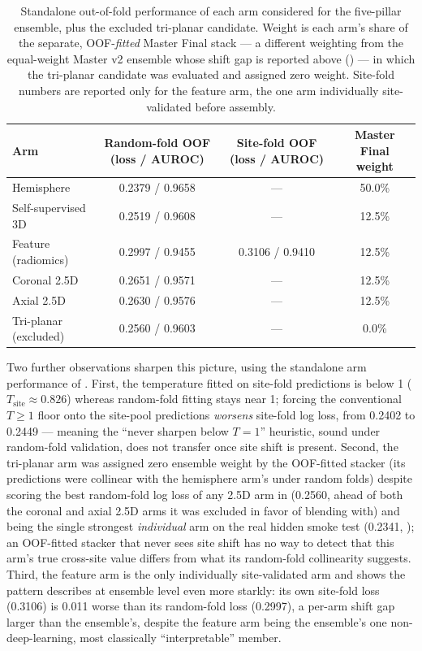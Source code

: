 \documentclass[11pt]{article}
\begin{document}
\begin{table}[t]
\centering
\small
\caption{Standalone out-of-fold performance of each arm considered for the five-pillar ensemble, plus the excluded tri-planar candidate. Weight is each arm's share of the separate, OOF-\emph{fitted} Master Final stack --- a different weighting from the equal-weight Master v2 ensemble whose shift gap is reported above () --- in which the tri-planar candidate was evaluated and assigned zero weight. Site-fold numbers are reported only for the feature arm, the one arm individually site-validated before assembly.}
\label{tab:arms}
\begin{tabular}{@{}lccc@{}}
\toprule
\textbf{Arm} & \textbf{Random-fold OOF (loss / AUROC)} & \textbf{Site-fold OOF (loss / AUROC)} & \textbf{Master Final weight} \\
\midrule
Hemisphere & 0.2379 / 0.9658 & --- & 50.0\% \\
Self-supervised 3D & 0.2519 / 0.9608 & --- & 12.5\% \\
Feature (radiomics) & 0.2997 / 0.9455 & 0.3106 / 0.9410 & 12.5\% \\
Coronal 2.5D & 0.2651 / 0.9571 & --- & 12.5\% \\
Axial 2.5D & 0.2630 / 0.9576 & --- & 12.5\% \\
\midrule
Tri-planar (excluded) & 0.2560 / 0.9603 & --- & 0.0\% \\
\bottomrule
\end{tabular}
\end{table}

Two further observations sharpen this picture, using the standalone arm performance of . First, the temperature fitted on site-fold predictions is below 1 ($T_{\text{site}} \approx 0.826$) whereas random-fold fitting stays near 1; forcing the conventional $T \geq 1$ floor onto the site-pool predictions \emph{worsens} site-fold log loss, from 0.2402 to 0.2449 --- meaning the ``never sharpen below $T=1$'' heuristic, sound under random-fold validation, does not transfer once site shift is present. Second, the tri-planar arm was assigned zero ensemble weight by the OOF-fitted stacker (its predictions were collinear with the hemisphere arm's under random folds) despite scoring the best random-fold log loss of any 2.5D arm in  (0.2560, ahead of both the coronal and axial 2.5D arms it was excluded in favor of blending with) and being the single strongest \emph{individual} arm on the real hidden smoke test (0.2341, ); an OOF-fitted stacker that never sees site shift has no way to detect that this arm's true cross-site value differs from what its random-fold collinearity suggests. Third, the feature arm is the only individually site-validated arm and shows the pattern  describes at ensemble level even more starkly: its own site-fold loss (0.3106) is 0.011 worse than its random-fold loss (0.2997), a per-arm shift gap larger than the ensemble's, despite the feature arm being the ensemble's one non-deep-learning, most classically ``interpretable'' member.
\end{document}
